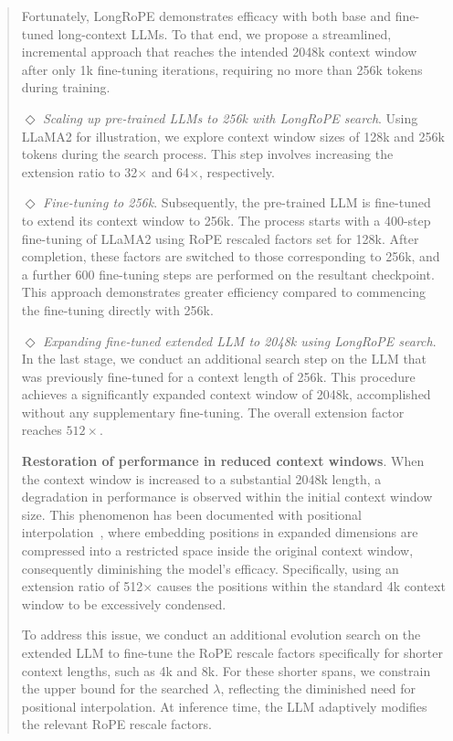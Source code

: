 \begin{abstract}
Fortunately, LongRoPE demonstrates efficacy with both base and fine-tuned long-context LLMs. To that end, we propose a streamlined, incremental approach that reaches the intended 2048k context window after only 1k fine-tuning iterations, requiring no more than 256k tokens during training.

$\Diamond$ \textit{Scaling up pre-trained LLMs to 256k with LongRoPE search}. Using LLaMA2 for illustration, we explore context window sizes of 128k and 256k tokens during the search process. This step involves increasing the extension ratio to 32$\times$ and 64$\times$, respectively.

$\Diamond$ \textit{Fine-tuning to 256k}. Subsequently, the pre-trained LLM is fine-tuned to extend its context window to 256k. The process starts with a 400-step fine-tuning of LLaMA2 using RoPE rescaled factors set for 128k. After completion, these factors are switched to those corresponding to 256k, and a further 600 fine-tuning steps are performed on the resultant checkpoint. This approach demonstrates greater efficiency compared to commencing the fine-tuning directly with 256k.

$\Diamond$ \textit{Expanding fine-tuned extended LLM to 2048k using LongRoPE search}. In the last stage, we conduct an additional search step on the LLM that was previously fine-tuned for a context length of 256k. This procedure achieves a significantly expanded context window of 2048k, accomplished without any supplementary fine-tuning. The overall extension factor reaches $512\times$.

\textbf{Restoration of performance in reduced context windows}. When the context window is increased to a substantial 2048k length, a degradation in performance is observed within the initial context window size. This phenomenon has been documented with positional interpolation~\cite{pi}, where embedding positions in expanded dimensions are compressed into a restricted space inside the original context window, consequently diminishing the model's efficacy. Specifically, using an extension ratio of 512$\times$ causes the positions within the standard 4k context window to be excessively condensed.

To address this issue, we conduct an additional evolution search on the extended LLM to fine-tune the RoPE rescale factors specifically for shorter context lengths, such as 4k and 8k. For these shorter spans, we constrain the upper bound for the searched $\lambda$, reflecting the diminished need for positional interpolation. At inference time, the LLM adaptively modifies the relevant RoPE rescale factors.


\end{abstract}
